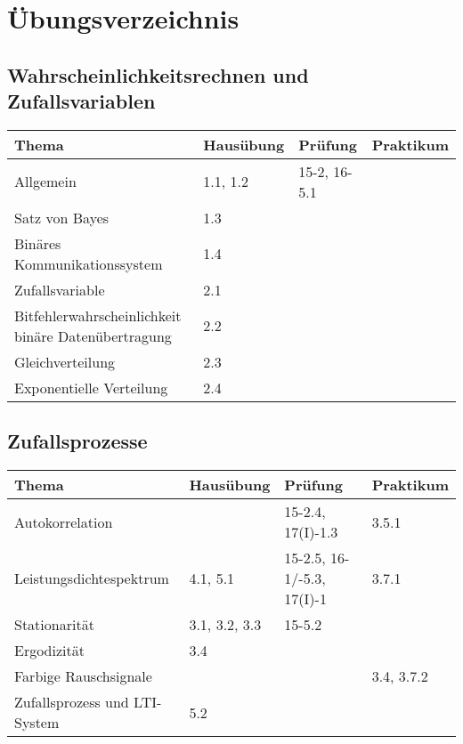 \section{Übungsverzeichnis}

\subsection{Wahrscheinlichkeitsrechnen und Zufallsvariablen}
	\begin{tabular}{|p{9cm}|p{2.5cm}|p{3.9cm}|p{1.6cm}|}
	\hline
	\textbf{Thema} & \textbf{Hausübung} & \textbf{Prüfung} & \textbf{Praktikum} \\ 
	\hline
	\hline
	Allgemein & 1.1, 1.2 & 15-2, 16-5.1& \\
	\hline
	Satz von Bayes & 1.3 & & \\
	\hline
	Binäres Kommunikationssystem & 1.4 & & \\
	\hline
	Zufallsvariable	& 2.1 & &  \\
	\hline
	Bitfehlerwahrscheinlichkeit binäre Datenübertragung & 2.2 & & \\
	\hline
	Gleichverteilung & 2.3 & & \\
	\hline
	Exponentielle Verteilung & 2.4 & & \\
	\hline
	\end{tabular}
\subsection{Zufallsprozesse}
	\begin{tabular}{|p{9cm}|p{2.5cm}|p{3.9cm}|p{1.6cm}|}
	\hline
	\textbf{Thema} & \textbf{Hausübung} & \textbf{Prüfung} & \textbf{Praktikum} \\ 
	\hline
	Autokorrelation	& & 15-2.4, 17(I)-1.3& 3.5.1 \\
	\hline
	Leistungsdichtespektrum & 4.1, 5.1 & 15-2.5, 16-1/-5.3, 17(I)-1& 3.7.1 \\
	\hline
	Stationarität & 3.1, 3.2, 3.3 & 15-5.2 & \\
	\hline
	Ergodizität	 & 3.4 & & \\
	\hline
	Farbige Rauschsignale & & & 3.4, 3.7.2\\
	\hline
	Zufallsprozess und LTI-System & 5.2 & & \\
	\hline
	\end{tabular}
